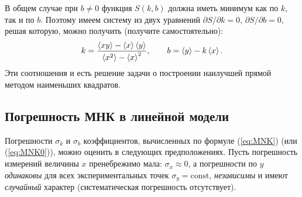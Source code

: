 В общем случае при $b\ne0$ функция $S\left(k,b\right)$ должна иметь
минимум как по $k$, так и по $b$. Поэтому имеем систему из двух
уравнений $\partial S/\partial k=0$, $\partial S/\partial b=0$,
решая которую, можно получить (получите самостоятельно):
\begin{equation}
    k=\frac{\average{xy}-\average{x}\average{y}}%
        {\average{x^{2}}-\average{x}^2},\qquad
        b=\average{y}-k\average{x}.\label{eq:MNK}
\end{equation}
Эти соотношения и есть решение задачи о построении наилучшей прямой
методом наименьших квадратов.


\subsection{Погрешность МНК в линейной модели}\label{sec:MNKerror}

Погрешности $\sigma_{k}$ и $\sigma_{b}$ коэффициентов, вычисленных
по формуле (\ref{eq:MNK}) (или (\ref{eq:MNK0})), можно оценить в
следующих предположениях.
Пусть погрешность измерений величины $x$ пренебрежимо мала: $\sigma_{x}\approx0$,
а погрешности по $y$ \emph{одинаковы} для всех экспериментальных точек
$\sigma_{y}=\mathrm{const}$, \emph{независимы} и имеют \emph{случайный} характер
(систематическая погрешность отсутствует).


